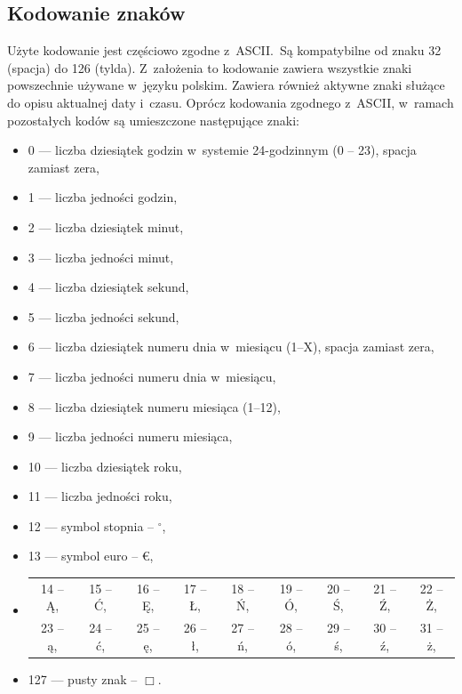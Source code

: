 \subsection{Kodowanie znaków}
Użyte kodowanie jest częściowo zgodne z~ASCII.~Są kompatybilne od znaku 32 (spacja) do 126 (tylda). Z~założenia to kodowanie zawiera wszystkie znaki powszechnie używane w~języku polskim. Zawiera również aktywne znaki służące do opisu aktualnej daty i~czasu. Oprócz kodowania zgodnego z~ASCII, w~ramach pozostałych kodów są umieszczone następujące znaki:

\begin{itemize}
\item 0 --- liczba dziesiątek godzin w~systemie 24-godzinnym (0 -- 23), spacja zamiast zera,
\item 1 --- liczba jedności godzin,
\item 2 --- liczba dziesiątek minut,
\item 3 --- liczba jedności minut,
\item 4 --- liczba dziesiątek sekund,
\item 5 --- liczba jedności sekund,
\item 6 --- liczba dziesiątek numeru dnia w~miesiącu (1--X), spacja zamiast zera,
\item 7 --- liczba jedności numeru dnia w~miesiącu,
\item 8 --- liczba dziesiątek numeru miesiąca (1--12),
\item 9 --- liczba jedności numeru miesiąca,
\item 10 --- liczba dziesiątek roku,
\item 11 --- liczba jedności roku,
\item 12 --- symbol stopnia -- \( ^{\circ} \),
\item 13 --- symbol euro -- \euro,
\item \begin{tabular}{ccccccccc}
14 -- Ą, & 15 -- Ć, & 16 -- Ę, & 17 -- Ł, & 18 -- Ń, & 19 -- Ó, & 20 -- Ś, & 21 -- Ź, & 22 -- Ż, \\
23 -- ą, & 24 -- ć, & 25 -- ę, & 26 -- ł, & 27 -- ń, & 28 -- ó, & 29 -- ś, & 30 -- ź, & 31 -- ż, \\
\end{tabular} 
\item 127 --- pusty znak -- \( \Box \).
\end{itemize}


